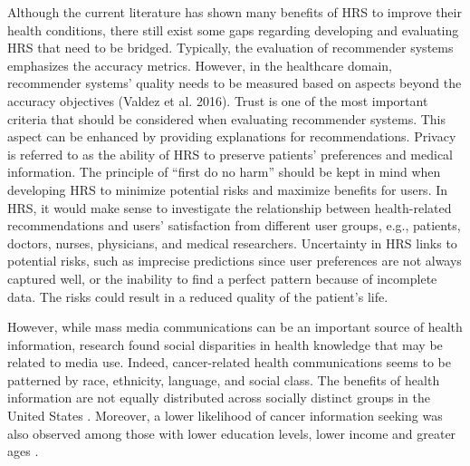 Although the current literature has shown many benefits of HRS to improve their health conditions, there still exist some gaps regarding developing and evaluating HRS that need to be bridged. Typically, the evaluation of recommender systems emphasizes the accuracy metrics. However, in the healthcare domain, recommender systems' quality needs to be measured based on aspects beyond the accuracy objectives (Valdez et al. 2016). Trust is one of the most important criteria that should be considered when evaluating recommender systems. This aspect can be enhanced by providing explanations for recommendations. Privacy is referred to as the ability of HRS to preserve patients' preferences and medical information. The principle of ``first do no harm'' should be kept in mind when developing HRS to minimize potential risks and maximize benefits for users. In HRS, it would make sense to investigate the relationship between health-related recommendations and users' satisfaction from different user groups, e.g., patients, doctors, nurses, physicians, and medical researchers. Uncertainty in HRS links to potential risks, such as imprecise predictions since user preferences are not always captured well, or the inability to find a perfect pattern because of incomplete data. The risks could result in a reduced quality of the patient's life.

However, while mass media communications can be an important source of health information, research found social disparities in health knowledge that may be related to media use. Indeed, cancer-related health communications seems to be patterned by race, ethnicity, language, and social class. The benefits of health information are not equally distributed across socially distinct groups in the United States \cite{viswanath_race_2011}. Moreover, a lower likelihood of cancer information seeking was also observed among those with lower education levels, lower income and greater ages \cite{finney_rutten_cancer-related_2016}.
